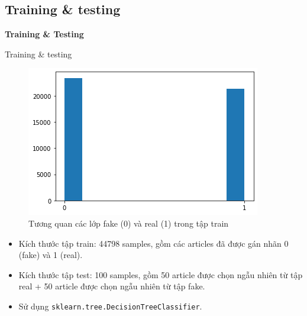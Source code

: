 \documentclass[aspectratio=169,xcolor=dvipsnames]{beamer}
\begin{document}
\subsection{Training \& testing}

\begin{frame}
	\Huge{\centerline{\textbf{Training \& Testing}}}
\end{frame}

\begin{frame}{Training \& testing}
\begin{figure}
\includegraphics[width=0.35\linewidth]{img/real-fake-in-train.png}
\caption{Tương quan các lớp fake (0) và real (1) trong tập train}
\end{figure}

\begin{itemize}
\item Kích thước tập train: 44798 samples, gồm các articles đã được gán nhãn 0 (fake) và 1 (real).
\item Kích thước tập test: 100 samples, gồm 50 article được chọn ngẫu nhiên từ tập real + 50 article được chọn ngẫu nhiên từ tập fake.
\item Sử dụng \texttt{sklearn.tree.DecisionTreeClassifier}.
\end{itemize}
\end{frame}
\end{document}

